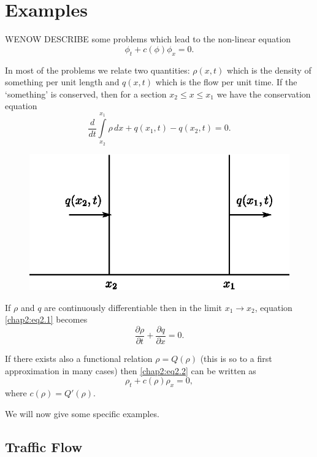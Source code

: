 
\chapter{Examples}\label{chap2}
WE\pageoriginale NOW DESCRIBE some problems which lead to the non-linear equation
$$
\phi_t+c(\phi)\phi_x=0.
$$

In most of the problems we relate two quantities: $\rho(x,t)$ which is the density of something per unit length and $q(x,t)$ which is the flow per unit time. If the `something' is conserved, then for a section $x_2\leq x\leq x_1$ we have the conservation equation 
\begin{equation}
\frac{d}{dt}\int\limits_{x_2}^{x_1}\rho\,dx+q(x_1,t)-q(x_2,t) =0.\label{chap2:eq2.1}
\end{equation}

\begin{figure}[H]
\centering
\includegraphics{figures/fig61-2.1.eps}
\caption{}
\label{chap1:fig2.1}
\end{figure}


If $\rho$ and $q$ are continuously differentiable then in the limit $x_1\to x_2$, equation \eqref{chap2:eq2.1} becomes
\begin{equation}
\frac{\partial\rho}{\partial t}+\frac{\partial q}{\partial x} =0.\label{chap2:eq2.2}
\end{equation}

If there exists also a functional relation $\rho =Q(\rho)$ (this is so to a first approximation in many cases) then \eqref{chap2:eq2.2} can be written as
\begin{equation}
\rho_t+c(\rho)\rho_x=0,\label{chap2:eq2.3}
\end{equation}\pageoriginale
where $c(\rho)=Q'(\rho)$.

We will now give some specific examples.

\section{Traffic Flow}\label{chap2:sec2.1}

